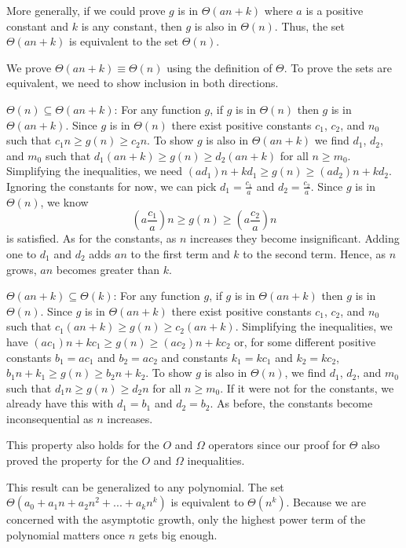 \begin{schemeregion}
More generally, if we could prove $g$ is in $\Theta(an+k)$ where $a$ is a positive constant and $k$ is any constant, then $g$ is also in $\Theta(n)$.  Thus, the set $\Theta(an+k)$ is equivalent to the set $\Theta(n)$.  

We prove $\Theta(an+k) \equiv \Theta(n)$ using the definition of $\Theta$.  To prove the sets are equivalent, we need to show inclusion in both directions.
\begin{descriptionlist}
\item[$\Theta(n) \subseteq \Theta(an+k)$:] For any function $g$, if $g$ is in $\Theta(n)$ then $g$ is in $\Theta(an+k)$. Since $g$ is in $\Theta(n)$ there exist positive constants $c_1$, $c_2$, and $n_0$ such that $c_1 n \ge g(n) \ge c_2 n$.  To show $g$ is also in $\Theta(an+k)$ we find $d_1$, $d_2$, and $m_0$ such that $d_1 (an + k) \ge g(n) \ge d_2 (an+k)$ for all $n \ge m_0$.  Simplifying the inequalities, we need $(ad_1)n + kd_1 \ge g(n) \ge (ad_2)n + kd_2$.  Ignoring the constants for now, we can pick $d_1 = \frac{c_1}{a}$ and $d_2 = \frac{c_2}{a}$.  Since $g$ is in $\Theta(n)$, we know 
\begin{displaymath}
(a\frac{c_1}{a})n \ge g(n) \ge (a\frac{c_2}{a})n
\end{displaymath}
is satisfied.  As for the constants, as $n$ increases they become insignificant.  Adding one to $d_1$ and $d_2$ adds $an$ to the first term and $k$ to the second term. Hence, as $n$ grows, $an$ becomes greater than $k$.  
\item[$\Theta(an + k) \subseteq \Theta(k)$:] For any function $g$, if $g$ is in $\Theta(an+k)$ then $g$ is in $\Theta(n)$. Since $g$ is in $\Theta(an+k)$ there exist positive constants $c_1$, $c_2$, and $n_0$ such that $c_1 (an+k) \ge g(n) \ge c_2 (an+k)$.  Simplifying the inequalities, we have $(ac_1)n + kc_1 \ge g(n) \ge (ac_2)n + kc_2$ or, for some different positive constants $b_1 = ac_1$ and $b_2 = ac_2$ and constants $k_1 = kc_1$ and $k_2=kc_2$, $b_1n + k_1 \ge g(n) \ge b_2 n + k_2$.  To show $g$ is also in $\Theta(n)$, we find $d_1$, $d_2$, and $m_0$ such that $d_1 n \ge g(n) \ge d_2 n$ for all $n \ge m_0$.  If it were not for the constants, we already have this with $d_1 = b_1$ and $d_2 = b_2$.  As before, the constants become inconsequential as $n$ increases.
\end{descriptionlist}
This property also holds for the $O$ and $\Omega$ operators since our proof for $\Theta$ also proved the property for the $O$ and $\Omega$ inequalities.

This result can be generalized to any polynomial.  The set $\Theta(a_0 + a_1 n + a_2 n^2 + ... + a_kn^k)$ is equivalent to $\Theta(n^k)$.  Because we are concerned with the asymptotic growth, only the highest power term of the polynomial matters once $n$ gets big enough.  


\end{schemeregion}

